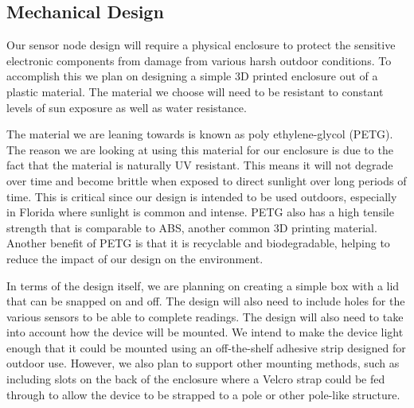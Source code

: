 \subsection{Mechanical Design}
Our sensor node design will require a physical enclosure to protect the sensitive electronic components from damage from various harsh outdoor conditions. To accomplish this we plan on designing a simple 3D printed enclosure out of a plastic material. The material we choose will need to be resistant to constant levels of sun exposure as well as water resistance.

The material we are leaning towards is known as poly ethylene-glycol (PETG). The reason we are looking at using this material for our enclosure is due to the fact that the material is naturally UV resistant. This means it will not degrade over time and become brittle when exposed to direct sunlight over long periods of time. This is critical since our design is intended to be used outdoors, especially in Florida where sunlight is common and intense. PETG also has a high tensile strength that is comparable to ABS, another common 3D printing material. Another benefit of PETG is that it is recyclable and biodegradable, helping to reduce the impact of our design on the environment.

In terms of the design itself, we are planning on creating a simple box with a lid that can be snapped on and off. The design will also need to include holes for the various sensors to be able to complete readings. The design will also need to take into account how the device will be mounted. We intend to make the device light enough that it could be mounted using an off-the-shelf adhesive strip designed for outdoor use. However, we also plan to support other mounting methods, such as including slots on the back of the enclosure where a Velcro strap could be fed through to allow the device to be strapped to a pole or other pole-like structure.